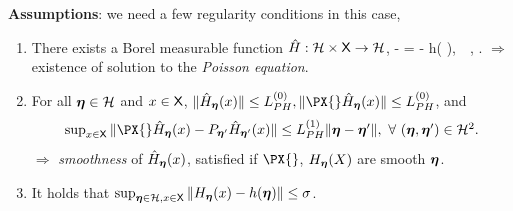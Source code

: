 \documentclass[a0,landscape]{a0poster}
\begin{document}
\begin{multicols}{3}
\begin{tcolorbox}[colback=white!5!white,colframe=red!75!black,fonttitle=\sffamily\bfseries\large,title=Analysis For Martingale Difference Noise (Case 1)]
\end{tcolorbox}

\begin{tcolorbox}[colback=white!5!white,colframe=red!75!black,fonttitle=\sffamily\bfseries\large,title=Analysis For State-dependent Markov Noise (Case 2)]
\textbf{Assumptions}: we need a few regularity conditions in this case,
\begin{enumerate}
\item There exists a Borel measurable function $\hat{H}: \mathcal{H} \times \mathsf{X} \to \mathcal{H}$,\vspace{-.1cm}
\beq \notag
\hHX{\prm}{\state} - \PX{}{} \hHX{\prm}{\state} = \HX{\prm}{\state} - h( \prm ),~\forall~\prm \in \Prm, \state \in \Xset. 
\eeq
$\Longrightarrow$ existence of solution to the \emph{\color{red}Poisson equation}. 
\item For all $\bm{\eta} \in \mathcal{H}$ and $x \in \mathsf{X}$, $\| \hHX{\prm}{\state} \|  \leq L^{(0)}_{PH}, \| \PX{} \hHX{\prm}{\state} \| \leq L_{PH}^{(0)}$, and
\begin{equation}\notag
\textstyle \sup_{\state \in \Xset} \| \PX{} \hHX{\prm}{\state} - {P}_{\prm'} \hHX{\prm'}{\state}  \|  \leq  L_{PH}^{(1)} \| \prm - \prm' \|,~\forall~(\prm, \prm') \in \Prm^2.
\end{equation}
$\Longrightarrow$ \emph{\color{red}smoothness} of $\hat{H}_{{\bm{\eta}}} ( x )$, satisfied if $\PX{}$, $H_{\bm{\eta}} ( X )$ are smooth \wrt $\bm{\eta}$.
\item It holds that $\sup_{\bm{\eta} \in \mathcal{H}, x \in \mathsf{X}}  \| H_{\bm{\eta}} ( x ) - h(\bm{\eta}) \| \leq \sigma$.\vspace{.3cm}


\end{enumerate}
\end{tcolorbox}
\end{multicols}
\end{document}
